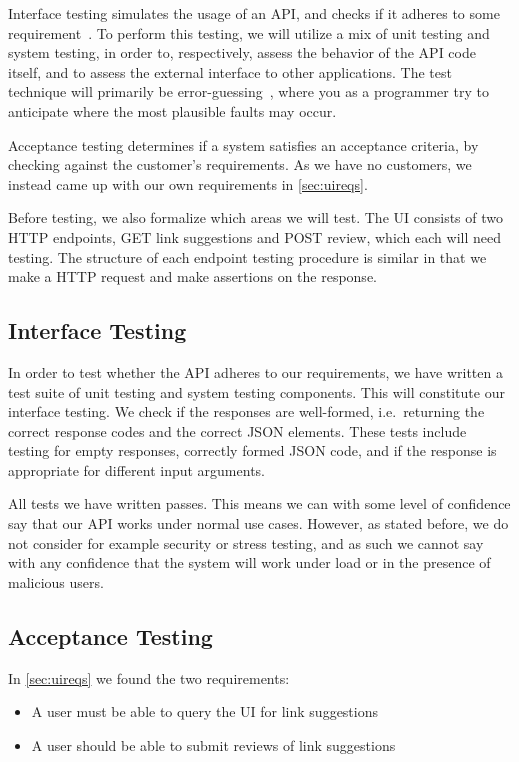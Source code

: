 Interface testing simulates the usage of an API, and checks if it adheres to some requirement~\cite{swebok}. To perform this testing, we will utilize a mix of unit testing and system testing, in order to, respectively, assess the behavior of the API code itself, and to assess the external interface to other applications. The test technique will primarily be error-guessing~\cite{swebok}, where you as a programmer try to anticipate where the most plausible faults may occur.

Acceptance testing determines if a system satisfies an acceptance criteria, by checking against the customer's requirements. As we have no customers, we instead came up with our own requirements in \cref{sec:uireqs}.


Before testing, we also formalize which areas we will test. The UI consists of two HTTP endpoints, GET link suggestions and POST review, which each will need testing. The structure of each endpoint testing procedure is similar in that we make a HTTP request and make assertions on the response.

\subsection{Interface Testing}
In order to test whether the API adheres to our requirements, we have written a test suite of unit testing and system testing components. This will constitute our interface testing. We check if the responses are well-formed, i.e.\ returning the correct response codes and the correct JSON elements. These tests include testing for empty responses, correctly formed JSON code, and if the response is appropriate for different input arguments.

All tests we have written passes. This means we can with some level of confidence say that our API works under normal use cases. However, as stated before, we do not consider for example security or stress testing, and as such we cannot say with any confidence that the system will work under load or in the presence of malicious users.

\subsection{Acceptance Testing}
In \cref{sec:uireqs} we found the two requirements:
\begin{itemize}
	\item A user must be able to query the UI for link suggestions
	\item A user should be able to submit reviews of link suggestions
\end{itemize}

